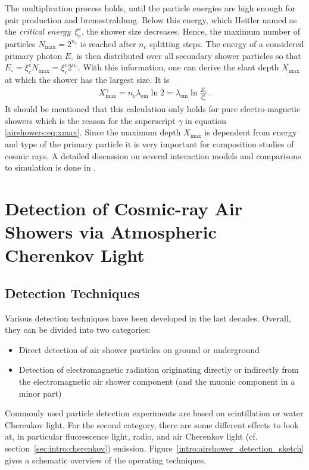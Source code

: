 The multiplication process holds, until the particle energies are high enough for pair production and bremsstrahlung. Below this energy, which Heitler named as the \textit{critical energy}~$\xi_c^e$, the shower size decreases. Hence, the maximum number of particles $N_\text{max} = 2^{n_c}$ is reached after $n_c$ splitting steps. The energy of a considered primary photon $E_\circ$ is then distributed over all secondary shower particles so that $E_\circ = \xi_c^e N_\text{max} = \xi_c^e 2^{n_c}$. With this information, one can derive the slant depth $X_\text{max}$ at which the shower has the largest size. It is
\begin{align}
	X_\text{max}^\gamma = n_c\lambda_\text{em}\ln{2} = \lambda_\text{em}\ln{\frac{E_\circ}{\xi_c^e}}\,.
	\label{airshowers:eq:xmax}
\end{align}
It should be mentioned that this calculation only holds for pure electro-magnetic showers which is the reason for the superscript $\gamma$ in equation \eqref{airshowers:eq:xmax}. \cite{airshowers:heitlermodel}
Since the maximum depth $X_\text{max}$ is dependent from energy and type of the primary particle it is very important for composition studies of cosmic rays. A detailed discussion on several interaction models and comparisons to simulation is done in \cite{airshowers:heitlermodel}.

\section{Detection of Cosmic-ray Air Showers via Atmospheric Cherenkov Light}\label{sec:cherenkov}

\subsection{Detection Techniques}

Various detection techniques have been developed in the last decades. Overall, they can be divided into two categories:
\begin{itemize}
	\item Direct detection of air shower particles on ground or underground
	\item Detection of electromagnetic radiation originating directly or indirectly from the electromagnetic air shower component (and the muonic component in a minor part)
\end{itemize}
Commonly used particle detection experiments are based on scintillation or water Cherenkov light.
For the second category, there are some different effects to look at, in particular fluorescence light, radio, and air Cherenkov light (cf. section~\ref{sec:intro:cherenkov}) emission. Figure~\ref{intro:airshower_detection_sketch} gives a schematic overview of the operating techniques.~\cite{airshowers:schroeder}\\

